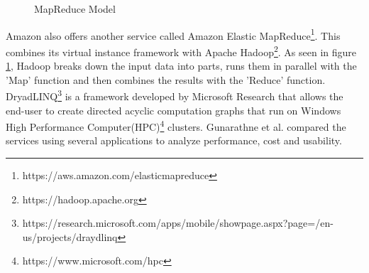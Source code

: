 \documentclass[12pt]{article}
\begin{document}
\begin{figure}
    \begin{center}
    \end{center}
    \caption{MapReduce Model}
    \label{fig:map}
\end{figure}

Amazon also offers another service called Amazon Elastic
MapReduce\footnote{https://aws.amazon.com/elasticmapreduce}. This combines its
virtual instance framework with Apache
Hadoop\footnote{https://hadoop.apache.org}. As seen in figure \ref{fig:map},
Hadoop breaks down the input data into parts, runs them in parallel with the
'Map' function and then combines the results with the 'Reduce' function.
DryadLINQ\footnote{https://research.microsoft.com/apps/mobile/showpage.aspx?page=/en-us/projects/draydlinq}
is a framework developed by Microsoft Research that allows the end-user to
create directed acyclic computation graphs that run on Windows High Performance
Computer(HPC)\footnote{https://www.microsoft.com/hpc} clusters.  Gunarathne et
al. compared the services using several applications to analyze performance,
cost and usability.
\end{document}
